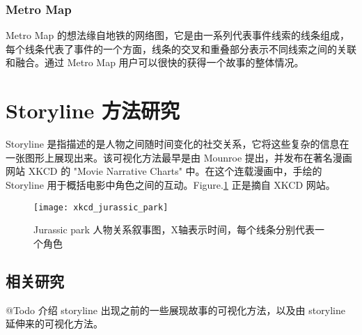 \subsubsection{Metro Map}
Metro Map \cite{shahaf2012trains} 的想法缘自地铁的网络图，它是由一系列代表事件线索的线条组成，每个线条代表了事件的一个方面，线条的交叉和重叠部分表示不同线索之间的关联和融合。通过 Metro Map 用户可以很快的获得一个故事的整体情况。

\section{Storyline 方法研究}
Storyline 是指描述的是人物之间随时间变化的社交关系，它将这些复杂的信息在一张图形上展现出来。该可视化方法最早是由 Mounroe 提出，并发布在著名漫画网站 XKCD 的 "Movie Narrative Charts" \cite{xkcd657} 中。在这个连载漫画中，手绘的 Storyline 用于概括电影中角色之间的互动。Figure.\ref{xkcd} 正是摘自 XKCD 网站。
\begin{figure}[htb]
	\centering
		\texttt{[image: xkcd\_jurassic\_park]}
	\caption{Jurassic park 人物关系叙事图，X轴表示时间，每个线条分别代表一个角色}
	\label{xkcd}
\end{figure}


\subsection{相关研究}
@Todo 介绍 storyline 出现之前的一些展现故事的可视化方法，以及由 storyline 延伸来的可视化方法。

